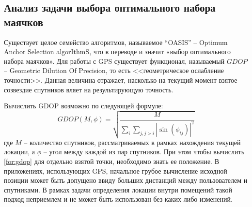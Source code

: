 \subsection{Анализ задачи выбора оптимального набора маячков}

Существует целое семейство алгоритмов, называемое “OASIS” – Optimum Anchor Selection algorIthmS, что в переводе и значит «выбор оптимального набора маячков». Для работы с GPS существует функционал, называемый $GDOP$ – Geometric Dilution Of Precision, то есть <<геометрическое ослабление точности>>. Данная величина отражает, насколько на текущий момент взятое созвездие спутников вляет на результирующую точность.

Вычислить GDOP возможно по следующей формуле:
\begin{equation} \label{for:gdop}
    GDOP(M, \phi)=\sqrt{ \frac{M}{\sum_i\sum_{j,j>i}|\sin(\phi_{ij})|^2} }
\end{equation}
где $M$ – количество спутников, рассматриваемых в рамках нахождения текущей локации, а $\phi$ – угол между каждой из пар спутников. При этом чтобы вычислить \ref{for:gdop} для отдельно взятой точки, необходимо знать ее положение. В приложениях, использующих GPS, начальное грубое вычисление исходной позиции может быть допущено ввиду больших дистанций между пользователем и спутниками. В рамках задачи определения локации внутри помещений такой подход неприемлем и не может быть использован без каких-либо изменений.


